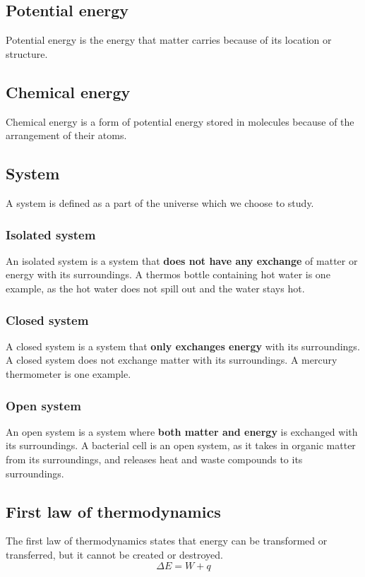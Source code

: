 \documentclass[11pt]{article}
\begin{document}
\subsection{Potential energy}
\label{sec:orgdd64851}
Potential energy is the energy that matter carries because of its location or structure.

\subsection{Chemical energy}
\label{sec:orgb8ff89f}
Chemical energy is a form of potential energy stored in molecules because of the arrangement of their atoms.

\subsection{System}
\label{sec:orgd542306}
A system is defined as a part of the universe which we choose to study.

\subsubsection{Isolated system}
\label{sec:orgbc193c4}
An isolated system is a system that \textbf{does not have any exchange} of matter or energy with its surroundings. A thermos bottle containing hot water is one example, as the hot water does not spill out and the water stays hot.

\subsubsection{Closed system}
\label{sec:orgc81ec3d}
A closed system is a system that \textbf{only exchanges energy} with its surroundings. A closed system does not exchange matter with its surroundings. A mercury thermometer is one example.

\subsubsection{Open system}
\label{sec:org406791b}
An open system is a system where \textbf{both matter and energy} is exchanged with its surroundings. A bacterial cell is an open system, as it takes in organic matter from its surroundings, and releases heat and waste compounds to its surroundings.

\newpage

\subsection{First law of thermodynamics}
\label{sec:org604c240}
The first law of thermodynamics states that energy can be transformed or transferred, but it cannot be created or destroyed.
\[\Delta E = W + q\]
\end{document}
